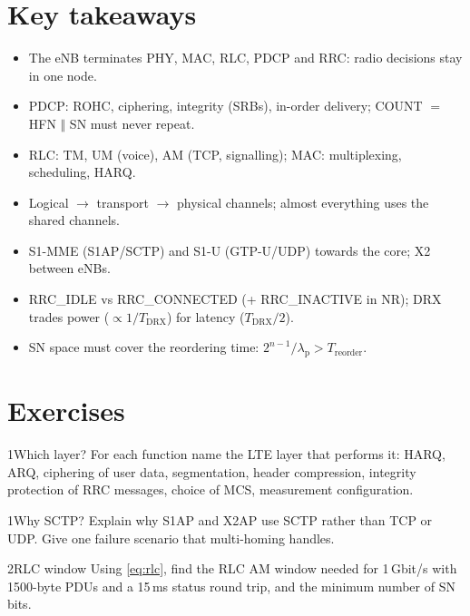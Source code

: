 \documentclass[11pt,a4paper]{article}
\begin{document}
\section{Key takeaways}
\begin{takeawaybox}
\begin{itemize}
  \item The eNB terminates PHY, MAC, RLC, PDCP and RRC: radio decisions stay in one node.
  \item PDCP: ROHC, ciphering, integrity (SRBs), in-order delivery; COUNT $=$ HFN $\Vert$ SN must never repeat.
  \item RLC: TM, UM (voice), AM (TCP, signalling); MAC: multiplexing, scheduling, HARQ.
  \item Logical $\to$ transport $\to$ physical channels; almost everything uses the shared channels.
  \item S1-MME (S1AP/SCTP) and S1-U (GTP-U/UDP) towards the core; X2 between eNBs.
  \item RRC\_IDLE vs RRC\_CONNECTED (+ RRC\_INACTIVE in NR); DRX trades power ($\propto1/T_{\mathrm{DRX}}$)
        for latency ($T_{\mathrm{DRX}}/2$).
  \item SN space must cover the reordering time: $2^{n-1}/\lambda_\mathrm{p} > T_{\mathrm{reorder}}$.
\end{itemize}
\end{takeawaybox}

\section{Exercises}

\begin{exercisebox}{1}{Which layer?}\label{exr:layer}
For each function name the LTE layer that performs it: HARQ, ARQ, ciphering of user data,
segmentation, header compression, integrity protection of RRC messages, choice of MCS, measurement
configuration.
\end{exercisebox}

\begin{exercisebox}{1}{Why SCTP?}\label{exr:sctp}
Explain why S1AP and X2AP use SCTP rather than TCP or UDP. Give one failure scenario that
multi-homing handles.
\end{exercisebox}

\begin{exercisebox}{2}{RLC window}\label{exr:rlc}
Using \cref{eq:rlc}, find the RLC AM window needed for 1\,Gbit/s with 1500-byte PDUs and a 15\,ms
status round trip, and the minimum number of SN bits.
\end{exercisebox}
\end{document}
